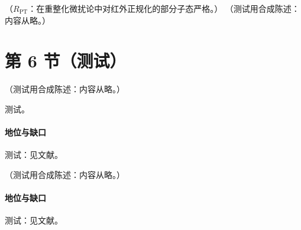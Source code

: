 \begin{proposition}\label{prop:sudakov-coulomb}
（$R_{\mathrm{PT}}$：在重整化微扰论中对红外正规化的部分子态严格。）
（测试用合成陈述：内容从略。）
\end{proposition}

\section{第 6 节（测试）}\label{sec:sudakov-collinear}

\begin{proposition}\label{prop:sudakov-amplitude-factorization}
（测试用合成陈述：内容从略。）
\end{proposition}
\begin{proofsketch}测试。\end{proofsketch}
\paragraph{地位与缺口}测试：见文献。

\begin{remark}\label{rem:sudakov-spacelike}
（测试用合成陈述：内容从略。）
\end{remark}
\paragraph{地位与缺口}测试：见文献。
